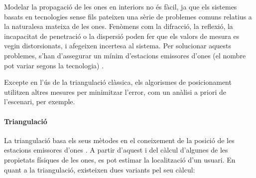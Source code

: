 Modelar la propagació de les ones en interiors no és fàcil, ja que els sistemes basats en tecnologies sense fils pateixen una sèrie de problemes comuns relatius a la naturalesa mateixa de les ones. Fenòmens com la difracció, la reflexió, la incapacitat de penetració o la dispersió poden fer que els valors de mesura es vegin distorsionats, i afegeixen incertesa al sistema. Per solucionar aquests problemes, s’han d’assegurar un mínim d'estacions emissores d’ones (el nombre pot variar segons la tecnologia) \cite{bagosi}.

Excepte en l'ús de la triangulació clàssica, els algorismes de posicionament utilitzen altres mesures per minimitzar l'error, com un anàlisi a priori de l'escenari, per exemple.

\paragraph{Triangulació}

La triangulació basa els seus mètodes en el coneixement de la posició de les estacions emissores d’ones \cite{bagosi}. A partir d’aquest i del càlcul d’algunes de les propietats físiques de les ones, es pot estimar la localització d’un usuari. En quant a la triangulació, existeixen dues variants pel seu càlcul:

